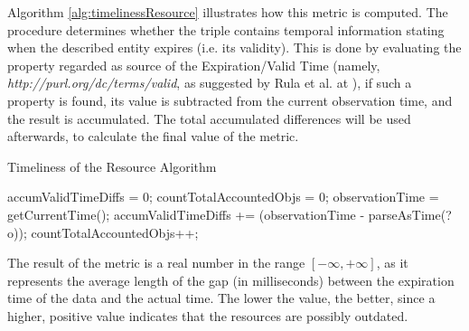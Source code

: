 Algorithm \ref{alg:timelinessResource} illustrates how this metric is computed. The procedure determines whether the triple contains  temporal information stating when the described entity expires (i.e. its validity). This is done by evaluating the property regarded as source  of the Expiration/Valid Time (namely, \textit{http://purl.org/dc/terms/valid}, as suggested by Rula et al. at \cite{Rula2012}), if such a property is found, its value is subtracted from the current observation time, and the result is accumulated. The total accumulated differences will be used afterwards, to calculate the final value of the metric.
\begin{algorithm}
\caption{Timeliness of the Resource Algorithm} \label{alg:timelinessResource}
\begin{algorithmic}[1]
\State accumValidTimeDiffs = 0;
\State countTotalAccountedObjs = 0;
\State observationTime = getCurrentTime();
\EndProcedure
{}
\State accumValidTimeDiffs += (observationTime - parseAsTime(?o));
\State countTotalAccountedObjs++;
\EndIf
{}
\EndProcedure
\end{algorithmic}
\end{algorithm}
The result of the metric is a real number in the range $[-\infty, +\infty]$, as it represents the average length of the gap (in  milliseconds) between the expiration time of the data and the actual time. The lower the value, the better, since a higher, positive value indicates that the resources are possibly outdated.


